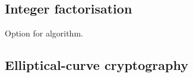 
\subsection{Integer factorisation}

Option for algorithm.

\subsection{Elliptical-curve cryptography}

